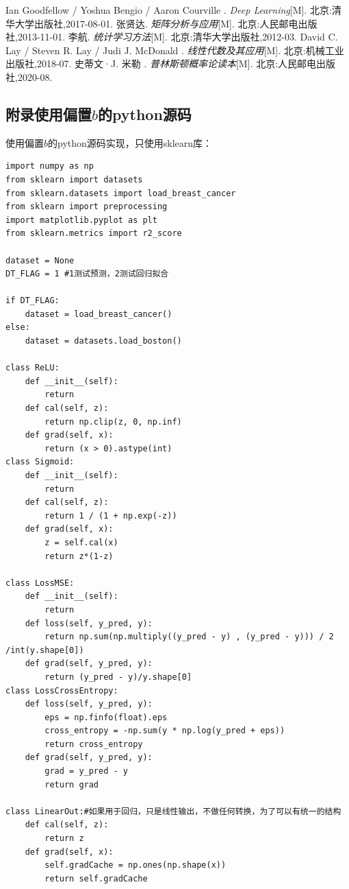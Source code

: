 \documentclass[12pt, a4paper, oneside]{ctexart}
\begin{document}
\newpage
\begin{thebibliography}{99}
    Ian Goodfellow / Yoshua Bengio / Aaron Courville . \emph{Deep Learning}[M]. 北京:清华大学出版社,2017-08-01.
    张贤达. \emph{矩阵分析与应用}[M]. 北京:人民邮电出版社,2013-11-01.
    李航. \emph{统计学习方法}[M]. 北京:清华大学出版社,2012-03.
    David C. Lay / Steven R. Lay / Judi J. McDonald . \emph{线性代数及其应用}[M]. 北京:机械工业出版社,2018-07.
    史蒂文·J. 米勒 . \emph{普林斯顿概率论读本}[M]. 北京:人民邮电出版社,2020-08.
\end{thebibliography}


\newpage
\begin{appendices}
\section{附录使用偏置$b$的python源码}
使用偏置$b$的python源码实现，只使用sklearn库：

\begin{lstlisting}
import numpy as np 
from sklearn import datasets
from sklearn.datasets import load_breast_cancer
from sklearn import preprocessing
import matplotlib.pyplot as plt
from sklearn.metrics import r2_score

dataset = None
DT_FLAG = 1 #1测试预测，2测试回归拟合

if DT_FLAG:
    dataset = load_breast_cancer()
else:
    dataset = datasets.load_boston()

class ReLU:
    def __init__(self):
        return
    def cal(self, z):
        return np.clip(z, 0, np.inf)
    def grad(self, x):
        return (x > 0).astype(int)
class Sigmoid:
    def __init__(self):
        return
    def cal(self, z):
        return 1 / (1 + np.exp(-z))
    def grad(self, x):
        z = self.cal(x)
        return z*(1-z)

class LossMSE:
    def __init__(self):
        return
    def loss(self, y_pred, y):
        return np.sum(np.multiply((y_pred - y) , (y_pred - y))) / 2 /int(y.shape[0]) 
    def grad(self, y_pred, y):
        return (y_pred - y)/y.shape[0]
class LossCrossEntropy:
    def loss(self, y_pred, y):
        eps = np.finfo(float).eps
        cross_entropy = -np.sum(y * np.log(y_pred + eps))
        return cross_entropy
    def grad(self, y_pred, y):
        grad = y_pred - y
        return grad

class LinearOut:#如果用于回归，只是线性输出，不做任何转换，为了可以有统一的结构
    def cal(self, z):
        return z
    def grad(self, x):
        self.gradCache = np.ones(np.shape(x))
        return self.gradCache


\end{lstlisting}
\end{appendices}
\end{document}
